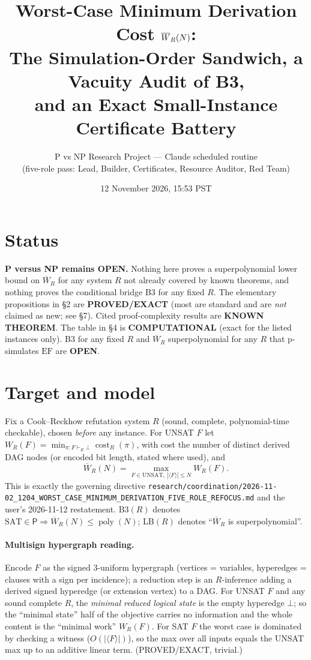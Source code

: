 \documentclass[11pt]{article}
\title{Worst-Case Minimum Derivation Cost $\Wb_R(N)$:\\
The Simulation-Order Sandwich, a Vacuity Audit of B3,\\
and an Exact Small-Instance Certificate Battery}
\author{P vs NP Research Project --- Claude scheduled routine\\
(five-role pass: Lead, Builder, Certificates, Resource Auditor, Red Team)}
\date{12 November 2026, 15:53 PST}
\theoremstyle{definition}
\newcommand{\SAT}{\mathrm{SAT}}
\newcommand{\UNSAT}{\mathrm{UNSAT}}
\newcommand{\poly}{\operatorname{poly}}
\newcommand{\Wb}{\overline W}
\newcommand{\EF}{\mathrm{EF}}
\begin{document}
\maketitle

\section*{Status}
\textbf{P versus NP remains OPEN.} Nothing here proves a superpolynomial lower
bound on $\Wb_R$ for any system $R$ not already covered by known theorems, and
nothing proves the conditional bridge B3 for any fixed $R$. The elementary
propositions in \S2 are \textbf{PROVED/EXACT} (most are standard and are
\emph{not} claimed as new; see \S7). Cited proof-complexity results are
\textbf{KNOWN THEOREM}. The table in \S4 is \textbf{COMPUTATIONAL} (exact for the
listed instances only). B3 for any fixed $R$ and $\Wb_R$ superpolynomial for any
$R$ that p-simulates $\EF$ are \textbf{OPEN}.

\section{Target and model}
Fix a Cook--Reckhow refutation system $R$ (sound, complete, polynomial-time
checkable), chosen \emph{before} any instance. For UNSAT $F$ let
$W_R(F)=\min_{\pi:F\vdash_R\bot}\operatorname{cost}_R(\pi)$, with cost the number of
distinct derived DAG nodes (or encoded bit length, stated where used), and
\[
\Wb_R(N)=\max_{F\in\UNSAT,\ |\langle F\rangle|\le N} W_R(F).
\]
This is exactly the governing directive
\texttt{research/coordination/2026-11-02\_1204\_WORST\_CASE\_MINIMUM\_DERIVATION\_FIVE\_ROLE\_REFOCUS.md}
and the user's 2026-11-12 restatement. B3$(R)$ denotes
$\SAT\in\mathsf P\Rightarrow \Wb_R(N)\le\poly(N)$; LB$(R)$ denotes
``$\Wb_R$ is superpolynomial''.

\paragraph{Multisign hypergraph reading.} Encode $F$ as the signed 3-uniform
hypergraph (vertices = variables, hyperedges = clauses with a sign per
incidence); a reduction step is an $R$-inference adding a derived signed
hyperedge (or extension vertex) to a DAG. For UNSAT $F$ and any sound complete
$R$, the \emph{minimal reduced logical state} is the empty hyperedge $\bot$; so
the ``minimal state'' half of the objective carries no information and the
whole content is the ``minimal work'' $W_R(F)$. For SAT $F$ the worst case is
dominated by checking a witness ($O(|\langle F\rangle|)$), so the max over all
inputs equals the UNSAT max up to an additive linear term. (PROVED/EXACT, trivial.)
\end{document}
